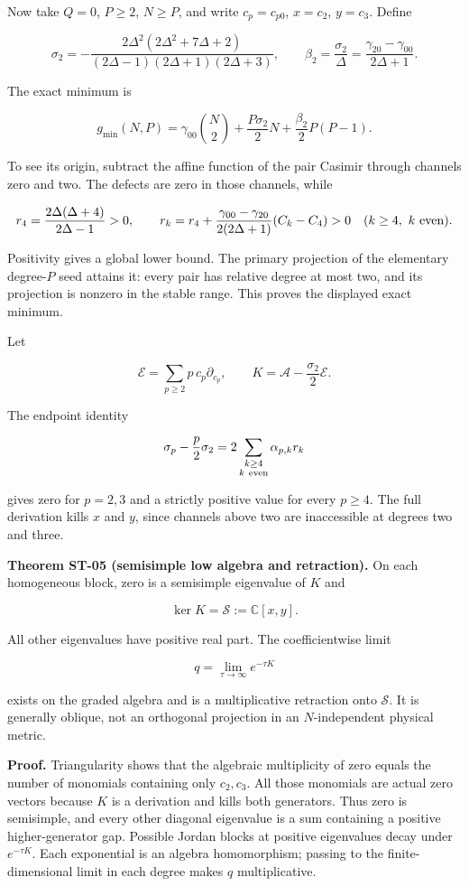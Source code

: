\documentclass[a4paper,11pt]{article}
\numberwithin{equation}{section}
\begin{document}
Now take \(Q=0\), \(P\geq2\), \(N\geq P\), and write \(c_p=c_{p0}\), \(x=c_2\), \(y=c_3\). Define

\[
\sigma_2=-\frac{2\Delta^2(2\Delta^2+7\Delta+2)}
{(2\Delta-1)(2\Delta+1)(2\Delta+3)},\qquad
\beta_2=\frac{\sigma_2}{\Delta}
=\frac{\gamma_{20}-\gamma_{00}}{2\Delta+1}.
\]

The exact minimum is

\[
g_{\min}(N,P)=
\gamma_{00}\binom N2+
\frac{P\sigma_2}{2}N+
\frac{\beta_2}{2}P(P-1).
\]

To see its origin, subtract the affine function of the pair Casimir through channels zero and two. The defects are zero in those channels, while

\[
r_4=\frac{2\Delta(\Delta+4)}{2\Delta-1}>0,\qquad
r_k=r_4+
\frac{\gamma_{00}-\gamma_{20}}{2(2\Delta+1)}(C_k-C_4)>0
\quad(k\geq4,\ k\ {\rm even}).
\]

Positivity gives a global lower bound. The primary projection of the elementary degree-\(P\) seed attains it: every pair has relative degree at most two, and its projection is nonzero in the stable range. This proves the displayed exact minimum.

Let

\[
\mathcal E=\sum_{p\geq2}p\,c_p\partial_{c_p},\qquad
K=\mathscr A-\frac{\sigma_2}{2}\mathcal E.
\]

The endpoint identity

\[
\sigma_p-\frac p2\sigma_2=
2\sum_{\substack{k\geq4\\k\ {\rm even}}}\alpha_{p,k}r_k
\]

gives zero for \(p=2,3\) and a strictly positive value for every \(p\geq4\). The full derivation kills \(x\) and \(y\), since channels above two are inaccessible at degrees two and three.

\textbf{Theorem ST-05 (semisimple low algebra and retraction).} On each homogeneous block, zero is a semisimple eigenvalue of \(K\) and

\[
\ker K=\mathcal S:=\mathbb C[x,y].
\]

All other eigenvalues have positive real part. The coefficientwise limit

\[
q=\lim_{\tau\to\infty}e^{-\tau K}
\]

exists on the graded algebra and is a multiplicative retraction onto \(\mathcal S\). It is generally oblique, not an orthogonal projection in an \(N\)-independent physical metric.

\textbf{Proof.} Triangularity shows that the algebraic multiplicity of zero equals the number of monomials containing only \(c_2,c_3\). All those monomials are actual zero vectors because \(K\) is a derivation and kills both generators. Thus zero is semisimple, and every other diagonal eigenvalue is a sum containing a positive higher-generator gap. Possible Jordan blocks at positive eigenvalues decay under \(e^{-\tau K}\). Each exponential is an algebra homomorphism; passing to the finite-dimensional limit in each degree makes \(q\) multiplicative.
\end{document}
